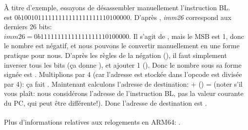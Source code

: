 À titre d'exemple, essayons de désassembler manuellement l'instruction BL.\\
 est $0b10010111111111111111111110100000$.
D'après , \emph{imm26} correspond aux derniers
26 bits:\\
$imm26 = 0b11111111111111111110100000$.
Il s'agit de , mais le \ac{MSB} est 1,
donc le nombre est négatif, et nous pouvons le convertir manuellement en une forme
pratique pour nous.
D'après les règles de la négation (), il faut simplement
inverser tous les bits (ça donne ), et ajouter 1 ().
Donc le nombre sous sa forme signée est .
Multiplions  par 4 (car l'adresse est stockée dans l'opcode est divisée
par 4): ça fait .
Maintenant calculons l'adresse de destination:  + () = 
(noter s'il vous plaît: nous considérons l'adresse de l'instruction BL, pas la valeur
courante du \ac{PC}, qui peut être différente!).
Donc l'adresse de destination est .\\
\\
Plus d'informations relatives aux relogements en ARM64: \ARMELF.
